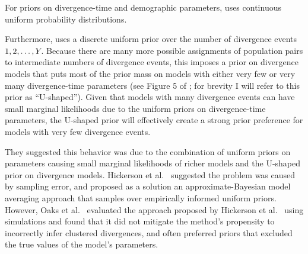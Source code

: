 For priors on divergence-time and demographic parameters, \msb uses continuous
uniform probability distributions.

Furthermore, \msb uses a discrete uniform prior over the number of divergence
events $1,2,\ldots,Y_{}$.
Because there are many more possible assignments of population pairs to
intermediate numbers of divergence events, this imposes a prior on divergence
models that puts most of the prior mass on models with either very few or very
many divergence-time parameters (see Figure 5 of \cite{Oaks2012}; for brevity
I will refer to this prior as ``U-shaped'').
Given that models with many divergence events can have small marginal
likelihoods due to the uniform priors on divergence-time parameters, the
U-shaped prior will effectively create a strong prior preference for models
with very few divergence events.

They suggested this behavior was due to the combination of uniform priors on
parameters causing small marginal likelihoods of richer models and the
U-shaped prior on divergence models.
Hickerson et al.\ \cite{Hickerson2013} suggested the problem was caused by
sampling error, and proposed as a solution an approximate-Bayesian model
averaging approach that samples over empirically informed uniform priors.
However, Oaks et al.\ \cite{Oaks2014reply} evaluated the approach proposed by
Hickerson et al.\ \cite{Hickerson2013} using simulations and found that it did
not mitigate the method's propensity to incorrectly infer clustered
divergences, and often preferred priors that excluded the true values of the
model's parameters.

